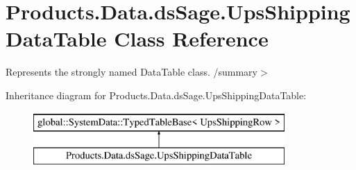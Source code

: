 \hypertarget{class_products_1_1_data_1_1ds_sage_1_1_ups_shipping_data_table}{}\section{Products.\+Data.\+ds\+Sage.\+Ups\+Shipping\+Data\+Table Class Reference}
\label{class_products_1_1_data_1_1ds_sage_1_1_ups_shipping_data_table}


Represents the strongly named Data\+Table class. /summary$>$  


Inheritance diagram for Products.\+Data.\+ds\+Sage.\+Ups\+Shipping\+Data\+Table\+:\begin{figure}[H]
\begin{center}
\leavevmode
\includegraphics[height=2.000000cm]{class_products_1_1_data_1_1ds_sage_1_1_ups_shipping_data_table}
\end{center}
\end{figure}
